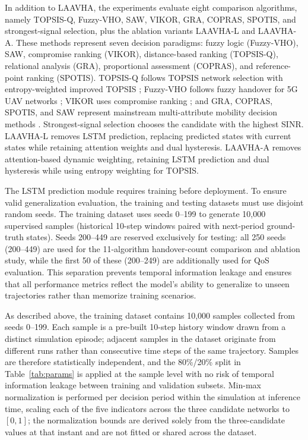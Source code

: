 \documentclass[final,3p,times,twocolumn]{elsarticle}
\begin{document}
In addition to LAAVHA, the experiments evaluate eight comparison algorithms, namely TOPSIS-Q, Fuzzy-VHO, SAW, VIKOR, GRA, COPRAS, SPOTIS, and strongest-signal selection, plus the ablation variants LAAVHA-L and LAAVHA-A. These methods represent seven decision paradigms: fuzzy logic (Fuzzy-VHO), SAW, compromise ranking (VIKOR), distance-based ranking (TOPSIS-Q), relational analysis (GRA), proportional assessment (COPRAS), and reference-point ranking (SPOTIS). TOPSIS-Q follows TOPSIS network selection with entropy-weighted improved TOPSIS \cite{ref8,ref9,ref10}; Fuzzy-VHO follows fuzzy handover for 5G UAV networks \cite{ref4}; VIKOR uses compromise ranking \cite{ref11}; and GRA, COPRAS, SPOTIS, and SAW represent mainstream multi-attribute mobility decision methods \cite{ref12}. Strongest-signal selection chooses the candidate with the highest SINR. LAAVHA-L removes LSTM prediction, replacing predicted states with current states while retaining attention weights and dual hysteresis. LAAVHA-A removes attention-based dynamic weighting, retaining LSTM prediction and dual hysteresis while using entropy weighting for TOPSIS.

The LSTM prediction module requires training before deployment. To ensure valid generalization evaluation, the training and testing datasets must use disjoint random seeds. The training dataset uses seeds 0--199 to generate 10,000 supervised samples (historical 10-step windows paired with next-period ground-truth states). Seeds 200--449 are reserved exclusively for testing: all 250 seeds (200--449) are used for the 11-algorithm handover-count comparison and ablation study, while the first 50 of these (200--249) are additionally used for QoS evaluation. This separation prevents temporal information leakage and ensures that all performance metrics reflect the model's ability to generalize to unseen trajectories rather than memorize training scenarios.

As described above, the training dataset contains 10,000 samples collected from seeds 0--199. Each sample is a pre-built 10-step history window drawn from a distinct simulation episode; adjacent samples in the dataset originate from different runs rather than consecutive time steps of the same trajectory. Samples are therefore statistically independent, and the 80\%/20\% split in Table~\ref{tab:params} is applied at the sample level with no risk of temporal information leakage between training and validation subsets. Min-max normalization is performed per decision period within the simulation at inference time, scaling each of the five indicators across the three candidate networks to $[0,1]$; the normalization bounds are derived solely from the three-candidate values at that instant and are not fitted or shared across the dataset.
\end{document}
